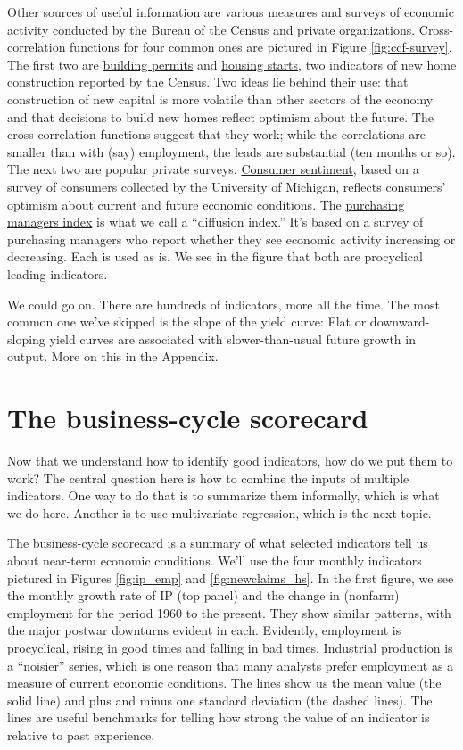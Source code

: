 Other sources of useful information are various measures and surveys
of economic activity conducted by the Bureau of the Census and
private organizations.
Cross-correlation functions for four common ones are pictured in
Figure \ref{fig:ccf-survey}.
The first two are \href{http://research.stlouisfed.org/fred2/series/PERMIT}{building permits} and \href{http://research.stlouisfed.org/fred2/series/HOUST}{housing starts},
two indicators of new home construction reported by the Census.
Two ideas lie behind their use:
that construction of new capital is more volatile than other sectors
of the economy
and that decisions to build new homes reflect optimism about the future.
The cross-correlation functions suggest that they work;
while the correlations are
smaller than with (say) employment, the leads are substantial
(ten months or so).
The next two are popular private surveys.
\href{http://research.stlouisfed.org/fred2/series/UMCSENT}{Consumer sentiment}, based on a survey of consumers
collected by the University of Michigan, reflects consumers' optimism about current and future economic conditions.
The \href{http://research.stlouisfed.org/fred2/series/NAPM}{purchasing managers index} is what we call a ``diffusion index.''
It's based on a survey of purchasing managers who report whether
they see economic activity increasing or decreasing.
Each is used as is.
We see in the figure that both are procyclical leading indicators.

We could go on.  There are hundreds of indicators, more all the time.
The most common one we've skipped is the slope of the yield curve:
Flat or downward-sloping yield curves are associated with slower-than-usual
future growth in output. More on this in the Appendix.


\section{The business-cycle scorecard}

Now that we understand how to identify good indicators,
how do we put them to work?
The central question here is how to combine the inputs of multiple indicators.
One way to do that is to summarize them informally, which is what we do here.
Another is to use multivariate regression, which is the next topic.

The business-cycle scorecard is a summary of
what selected indicators tell us about near-term economic conditions.
We'll use the four monthly indicators pictured
in Figures \ref{fig:ip_emp} and \ref{fig:newclaims_hs}.
In the first figure, we see the monthly growth rate
of IP (top panel) and the change in (nonfarm) employment
for the period 1960 to the present.
They show similar patterns, with the major postwar
downturns evident in each.
Evidently, employment is procyclical,  rising in good times
and falling in bad times.
Industrial production is a ``noisier'' series, which is one reason that
many analysts prefer employment as a measure of current economic
conditions. The lines show us the mean value (the solid line)
and plus and minus
one standard deviation (the dashed lines).
The lines are useful benchmarks for telling how strong the
value of an indicator is relative to past experience.

